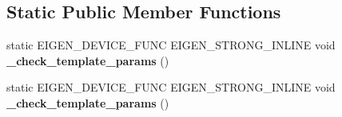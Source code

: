 \subsection*{Static Public Member Functions}
\begin{DoxyCompactItemize}
\item 
\mbox{\label{class_eigen_1_1_plain_object_base_a1415788822fe8339c6b92de20b48f383}} 
static E\+I\+G\+E\+N\+\_\+\+D\+E\+V\+I\+C\+E\+\_\+\+F\+U\+NC E\+I\+G\+E\+N\+\_\+\+S\+T\+R\+O\+N\+G\+\_\+\+I\+N\+L\+I\+NE void {\bfseries \+\_\+check\+\_\+template\+\_\+params} ()
\item 
\mbox{\label{class_eigen_1_1_plain_object_base_a1415788822fe8339c6b92de20b48f383}} 
static E\+I\+G\+E\+N\+\_\+\+D\+E\+V\+I\+C\+E\+\_\+\+F\+U\+NC E\+I\+G\+E\+N\+\_\+\+S\+T\+R\+O\+N\+G\+\_\+\+I\+N\+L\+I\+NE void {\bfseries \+\_\+check\+\_\+template\+\_\+params} ()
\end{DoxyCompactItemize}
